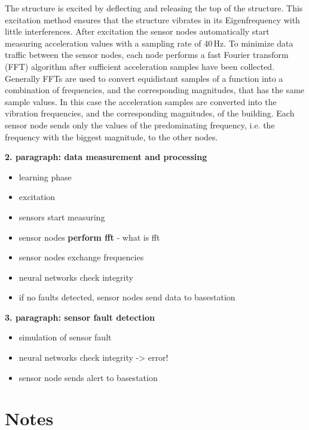 \documentclass[12pt,a4paper]{scrartcl}
\begin{document}
	The structure is excited by deflecting and releasing the top of the structure.
	This excitation method ensures that the structure vibrates in its Eigenfrequency with little interferences.
	After excitation the sensor nodes automatically start measuring acceleration values with a sampling rate of 40\,Hz.
	To minimize data traffic between the sensor nodes, each node performs a fast Fourier transform (FFT) algorithm after sufficient acceleration samples have been collected.
	Generally FFTs are used to convert equidistant samples of a function into a combination of frequencies, and the corresponding magnitudes, that has the same sample values.
	In this case the acceleration samples are converted into the vibration frequencies, and the corresponding magnitudes, of the building.
	Each sensor node sends only the values of the predominating frequency, i.e. the frequency with the biggest magnitude, to the other nodes.
	
	
	
	
	
	\textbf{2. paragraph: data measurement and processing}
	
	\begin{itemize}
		\item learning phase
		\item excitation
		\item sensors start measuring
		\item sensor nodes \textbf{perform fft} - what is fft
		\item sensor nodes exchange frequencies
		\item neural networks check integrity
		\item if no faults detected, sensor nodes send data to basestation
	\end{itemize}
	
	\textbf{3. paragraph: sensor fault detection}
	
	\begin{itemize}
		\item simulation of sensor fault
		\item neural networks check integrity -> error!
		\item sensor node sends alert to basestation
	\end{itemize}
	
	
	\section*{Notes}
	
\end{document}
